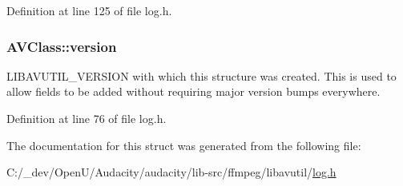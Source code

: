 Definition at line 125 of file log.\+h.

\subsubsection[{\texorpdfstring{version}{version}}]{ A\+V\+Class\+::version}\hypertarget{struct_a_v_class_a7859d861c0924aa74d848f93253c263a}{}\label{struct_a_v_class_a7859d861c0924aa74d848f93253c263a}
L\+I\+B\+A\+V\+U\+T\+I\+L\+\_\+\+V\+E\+R\+S\+I\+ON with which this structure was created. This is used to allow fields to be added without requiring major version bumps everywhere. 

Definition at line 76 of file log.\+h.



The documentation for this struct was generated from the following file\+:\begin{DoxyCompactItemize}
\item 
C\+:/\+\_\+dev/\+Open\+U/\+Audacity/audacity/lib-\/src/ffmpeg/libavutil/\hyperlink{ffmpeg_2libavutil_2log_8h}{log.\+h}\end{DoxyCompactItemize}
